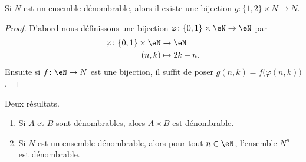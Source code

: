 \begin{lemma}        \label{LEMooRXSRooBUWOyb}
	Si \( N\) est un ensemble dénombrable, alors il existe une bijection \( g\colon \{ 1,2 \}\times N\to N\).
\end{lemma}

\begin{proof}
	D'abord nous définissons une bijection \( \varphi\colon \{ 0,1 \}\times \eN\to \eN\) par
	\begin{equation}
		\begin{aligned}
			\varphi\colon \{ 0,1 \}\times \eN & \to \eN       \\
			(n,k)                             & \mapsto 2k+n.
		\end{aligned}
	\end{equation}
	Ensuite si \( f\colon \eN\to N\) est une bijection, il suffit de poser \( g(n,k)=f\big( \varphi(n,k) \big)\).
\end{proof}

\begin{proposition}     \label{PROPooDMZHooXouDrQ}
	Deux résultats.
	\begin{enumerate}
		\item		\label{ITEMooWNBGooZjoIjZ}
		      Si \( A\) et \( B\) sont dénombrables, alors \( A\times B\) est dénombrable.
		\item
		      Si \( N\) est un ensemble dénombrable, alors pour tout \( n\in \eN\), l'ensemble \( N^n\) est dénombrable.
	\end{enumerate}
\end{proposition}

